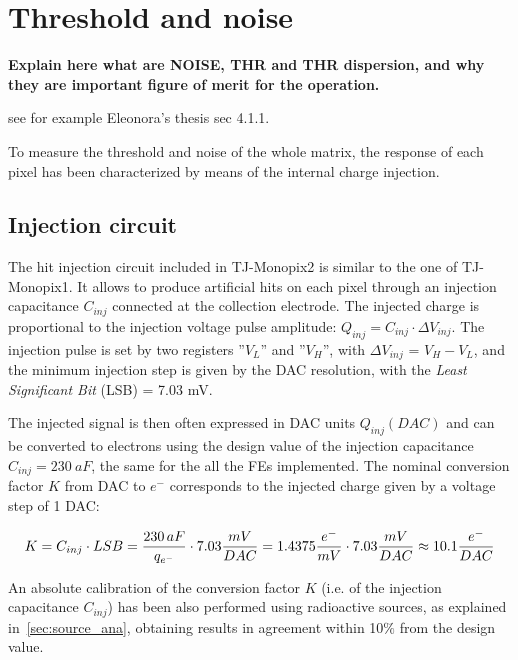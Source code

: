 
\section{Threshold and noise} \label{thresh_noise}


\textbf{Explain here what are NOISE, THR and THR dispersion, and why they are important figure of merit for the operation.} 

see for example Eleonora's thesis sec 4.1.1. 


To measure the threshold and noise of the whole matrix, the response of each pixel has been characterized by means of the internal charge injection. \\

\subsection{Injection circuit} \label{inj_circuit_subsection}

The hit injection circuit included in TJ-Monopix2 is similar to the one of TJ-Monopix1. 
It allows to produce artificial hits on each pixel through an injection capacitance \textbf{$C_{inj}$} connected at the collection electrode. The injected charge is proportional to the injection voltage pulse amplitude: $Q_{inj} = C_{inj} \cdot \Delta V_{inj}$. The injection pulse is set by two registers ''\textbf{$V_{L}$}'' and ''\textbf{$V_{H}$}'', with $\Delta V_{inj}$ = \textbf{$V_{H}-V_{L}$}, and the minimum injection step is given by the DAC resolution, with the \textit{Least Significant Bit} (LSB) = 7.03 mV. 

The injected signal is then often expressed in DAC units $Q_{inj}(DAC)$ and can be converted to electrons using the design value of the injection capacitance \textbf{$C_{inj}= 230\ aF$}, the same for the all the FEs implemented.  
The nominal conversion factor $K$ from DAC to $e^{-}$ corresponds to the injected charge given by a voltage step of 1 DAC: 

\begin{equation}
\small
K = C_{inj} \cdot LSB = \frac{230 \, aF}{q_{{e}^{-}}} \cdot 7.03 \frac{mV}{DAC}= 1.4375 \frac{e^{-}}{mV} \cdot 7.03 \frac{mV}{DAC} \approx 10.1 \frac{e^{-}}{DAC}  
\label{eq:conversion_factor}
\end{equation}


An absolute calibration of the conversion factor $K$ (i.e. of the injection capacitance $C_{inj}$) has been also performed using radioactive sources, as explained in~\autoref{sec:source_ana}, obtaining results in agreement within 10$\%$ from the design value. 

